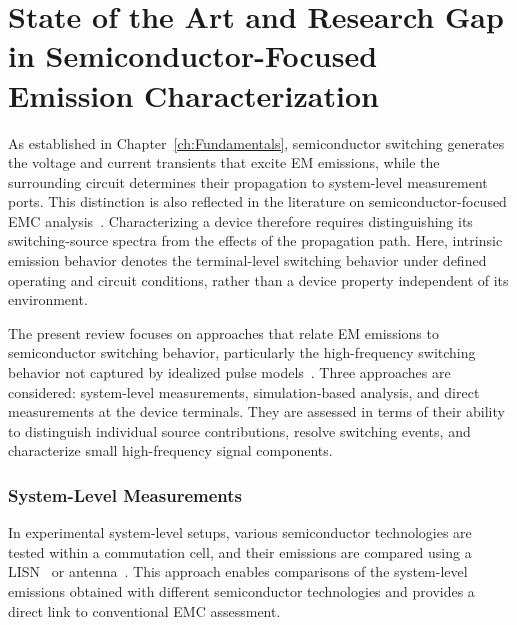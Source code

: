 \section{State of the Art and Research Gap in Semiconductor-Focused Emission Characterization}

As established in Chapter~\ref{ch:Fundamentals}, semiconductor switching generates the voltage and current transients that excite EM emissions, while the surrounding circuit determines their propagation to system-level measurement ports.
This distinction is also reflected in the literature on semiconductor-focused EMC analysis~\cite{hillenbrand_frequency_2016,takahashi_noise-source_2021,marlier_modeling_2012}.
Characterizing a device therefore requires distinguishing its switching-source spectra from the effects of the propagation path.
Here, intrinsic emission behavior denotes the terminal-level switching behavior under defined operating and circuit conditions, rather than a device property independent of its environment.

The present review focuses on approaches that relate EM emissions to semiconductor switching behavior, particularly the high-frequency switching behavior not captured by idealized pulse models~\cite{kragl_impact_2024}.
Three approaches are considered: system-level measurements, simulation-based analysis, and direct measurements at the device terminals.
They are assessed in terms of their ability to distinguish individual source contributions, resolve switching events, and characterize small high-frequency signal components.

\subsubsection*{System-Level Measurements}
In experimental system-level setups, various semiconductor technologies are tested within a commutation cell, and their emissions are compared using a LISN~\cite{apelsmeier_model_2020, takahashi_noise-source_2021, zhang_two-port_2020, tlig_conducted_2025, lemmon_methodology_2018, huber_ultra-low_2017} or antenna~\cite{radchenko_transfer_2014,domurat-linde_analysis_2012}. 
This approach enables comparisons of the system-level emissions obtained with different semiconductor technologies and provides a direct link to conventional EMC assessment.


